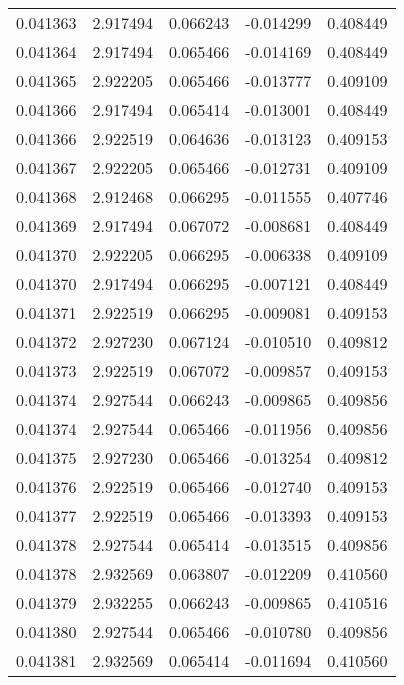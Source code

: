 \begin{tabular}{lrrrr}
0.041363    &  2.917494 &  0.066243 & -0.014299 &             0.408449 \\
0.041364    &  2.917494 &  0.065466 & -0.014169 &             0.408449 \\
0.041365    &  2.922205 &  0.065466 & -0.013777 &             0.409109 \\
0.041366    &  2.917494 &  0.065414 & -0.013001 &             0.408449 \\
0.041366    &  2.922519 &  0.064636 & -0.013123 &             0.409153 \\
0.041367    &  2.922205 &  0.065466 & -0.012731 &             0.409109 \\
0.041368    &  2.912468 &  0.066295 & -0.011555 &             0.407746 \\
0.041369    &  2.917494 &  0.067072 & -0.008681 &             0.408449 \\
0.041370    &  2.922205 &  0.066295 & -0.006338 &             0.409109 \\
0.041370    &  2.917494 &  0.066295 & -0.007121 &             0.408449 \\
0.041371    &  2.922519 &  0.066295 & -0.009081 &             0.409153 \\
0.041372    &  2.927230 &  0.067124 & -0.010510 &             0.409812 \\
0.041373    &  2.922519 &  0.067072 & -0.009857 &             0.409153 \\
0.041374    &  2.927544 &  0.066243 & -0.009865 &             0.409856 \\
0.041374    &  2.927544 &  0.065466 & -0.011956 &             0.409856 \\
0.041375    &  2.927230 &  0.065466 & -0.013254 &             0.409812 \\
0.041376    &  2.922519 &  0.065466 & -0.012740 &             0.409153 \\
0.041377    &  2.922519 &  0.065466 & -0.013393 &             0.409153 \\
0.041378    &  2.927544 &  0.065414 & -0.013515 &             0.409856 \\
0.041378    &  2.932569 &  0.063807 & -0.012209 &             0.410560 \\
0.041379    &  2.932255 &  0.066243 & -0.009865 &             0.410516 \\
0.041380    &  2.927544 &  0.065466 & -0.010780 &             0.409856 \\
0.041381    &  2.932569 &  0.065414 & -0.011694 &             0.410560 \\

\end{tabular}
